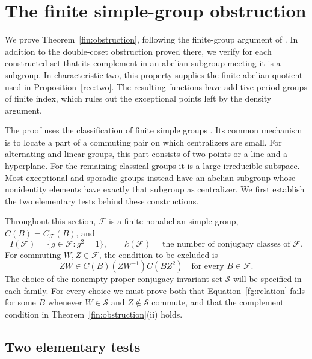 \section{The finite simple-group obstruction}\label{sec:finite-groups}

We prove Theorem~\ref{fin:obstruction}, following the finite-group
argument of \cite[Section~6]{MPNF}. In addition to the double-coset
obstruction proved there, we verify for each constructed set that its
complement in an abelian subgroup meeting it is a subgroup. In
characteristic two, this property supplies the finite abelian quotient
used in Proposition~\ref{rec:two}. The resulting functions have additive
period groups of finite index, which rules out the exceptional points
left by the density argument.

The proof uses the classification of finite simple groups
\cite[Classification Theorem, p.~737]{Aschbacher2004}. Its common
mechanism is to locate a part of a commuting pair on which centralizers
are small. For alternating and linear groups, this part consists of two
points or a line and a hyperplane. For the remaining classical groups it
is a large irreducible subspace. Most exceptional and sporadic groups
instead have an abelian subgroup whose nonidentity elements have exactly
that subgroup as centralizer. We first establish the two elementary tests
behind these constructions.

Throughout this section, $\mathcal F$ is a finite nonabelian simple group,
$C(B)=C_{\mathcal F}(B)$, and
\[
 I(\mathcal F)=\{g\in\mathcal F:g^2=1\},\qquad
 k(\mathcal F)=\text{the number of conjugacy classes of }\mathcal F.
\]
For commuting $W,Z\in\mathcal F$, the condition to be excluded is
\begin{equation}\label{fg:relation}
 ZW\in C(B)(ZW^{-1})C(BZ^2)
 \quad\text{for every }B\in\mathcal F.
\end{equation}
The choice of the nonempty proper conjugacy-invariant set $\mathcal S$
will be specified in each family. For every choice we must prove both
that Equation~\eqref{fg:relation} fails for some $B$ whenever
$W\in\mathcal S$ and $Z\notin\mathcal S$ commute, and that the
complement condition in Theorem~\ref{fin:obstruction}(ii) holds.

\subsection{Two elementary tests}

